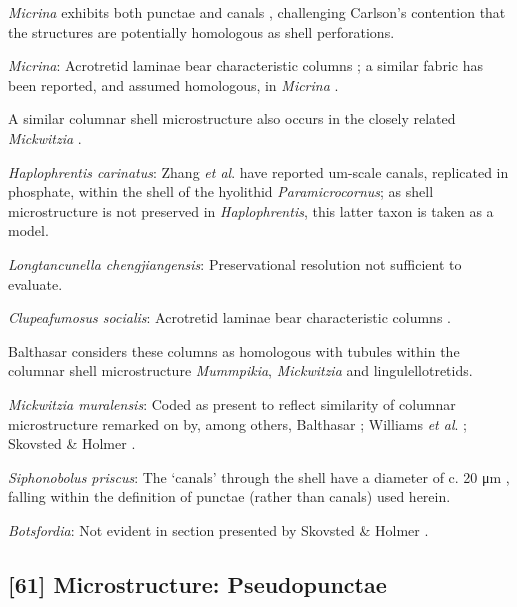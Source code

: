 \documentclass[]{book}
\theoremstyle{definition}
\theoremstyle{definition}
\theoremstyle{definition}
\theoremstyle{remark}
\begin{document}
\emph{Micrina} exhibits both punctae and canals
\citep{Harper2017Brachiopodsorigin}, challenging Carlson's contention
\citep[in][]{Williams2007PartH} that the structures are potentially
homologous as shell perforations.

\emph{Micrina}: Acrotretid laminae bear characteristic columns
\citep[e.g.][]{Zhang2016Epithelialcell}; a similar fabric has been
reported, and assumed homologous, in \emph{Micrina}
\citep{Butler2012ConstructingCambrian}.

A similar columnar shell microstructure also occurs in the closely
related \emph{Mickwitzia} \citep{Balthasar2008iMummpikia}.

\emph{Haplophrentis carinatus}: Zhang \emph{et al}.
\citeyearpar{Zhang2018Ahyolithid} have reported um-scale canals,
replicated in phosphate, within the shell of the hyolithid
\emph{Paramicrocornus}; as shell microstructure is not preserved in
\emph{Haplophrentis}, this latter taxon is taken as a model.

\emph{Longtancunella chengjiangensis}: Preservational resolution not
sufficient to evaluate.

\emph{Clupeafumosus socialis}: Acrotretid laminae bear characteristic
columns \citep[e.g.][]{Zhang2016Epithelialcell}.

Balthasar \citeyearpar{Balthasar2008iMummpikia} considers these columns
as homologous with tubules within the columnar shell microstructure
\emph{Mummpikia}, \emph{Mickwitzia} and lingulellotretids.

\emph{Mickwitzia muralensis}: Coded as present to reflect similarity of
columnar microstructure remarked on by, among others, Balthasar
\citeyearpar{Balthasar2008iMummpikia}; Williams \emph{et al}.
\citeyearpar{Williams2007PartH}; Skovsted \& Holmer
\citeyearpar{Skovsted2003EarlyCambrian}.

\emph{Siphonobolus priscus}: The `canals' through the shell have a
diameter of c. 20 μm \citep[text-fig. 2a]{Williams2004Chemicostructure},
falling within the definition of punctae (rather than canals) used
herein.

\emph{Botsfordia}: Not evident in section presented by Skovsted \&
Holmer \citeyearpar{Skovsted2003EarlyCambrian}.

\hypertarget{microstructure-pseudopunctae}{%
\subsection*{{[}61{]} Microstructure:
Pseudopunctae}\label{microstructure-pseudopunctae}}
\end{document}
